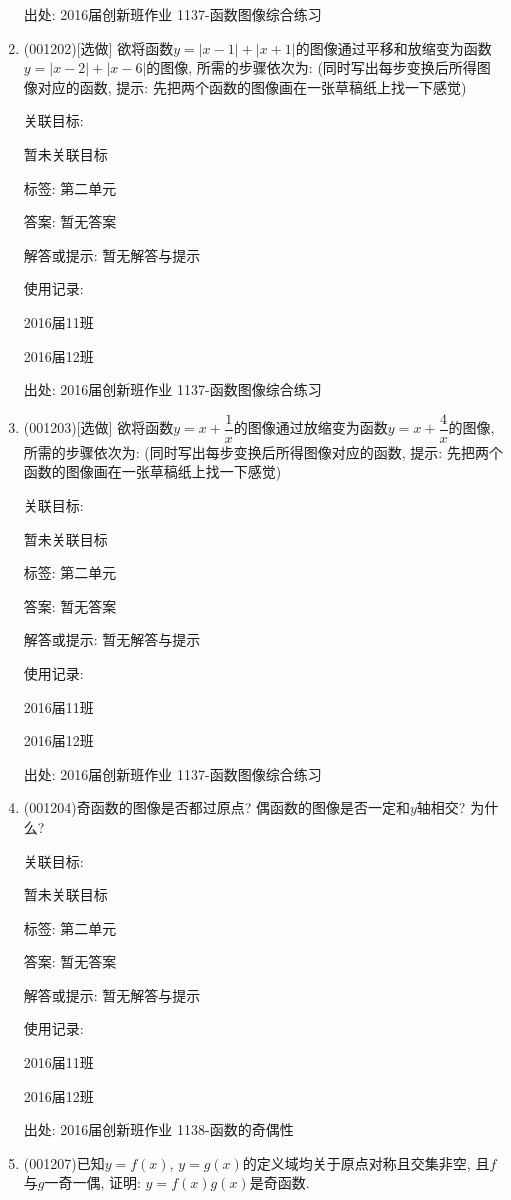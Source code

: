 \documentclass[10pt,a4paper]{article}
\begin{document}
\begin{enumerate}[1.]
出处: 2016届创新班作业	1137-函数图像综合练习
\item { (001202)}[选做]
欲将函数$y=|x-1|+|x+1|$的图像通过平移和放缩变为函数$y=|x-2|+|x-6|$的图像, 所需的步骤依次为: (同时写出每步变换后所得图像对应的函数, 提示: 先把两个函数的图像画在一张草稿纸上找一下感觉)


关联目标:

暂未关联目标



标签: 第二单元

答案: 暂无答案

解答或提示: 暂无解答与提示

使用记录:

2016届11班	

2016届12班	


出处: 2016届创新班作业	1137-函数图像综合练习
\item { (001203)}[选做]
欲将函数$y=x+\dfrac{1}{x}$的图像通过放缩变为函数$y=x+\dfrac{4}{x}$的图像, 所需的步骤依次为: (同时写出每步变换后所得图像对应的函数, 提示: 先把两个函数的图像画在一张草稿纸上找一下感觉)


关联目标:

暂未关联目标



标签: 第二单元

答案: 暂无答案

解答或提示: 暂无解答与提示

使用记录:

2016届11班	

2016届12班	


出处: 2016届创新班作业	1137-函数图像综合练习
\item { (001204)}奇函数的图像是否都过原点? 偶函数的图像是否一定和$y$轴相交? 为什么?


关联目标:

暂未关联目标



标签: 第二单元

答案: 暂无答案

解答或提示: 暂无解答与提示

使用记录:

2016届11班	

2016届12班	


出处: 2016届创新班作业	1138-函数的奇偶性
\item { (001207)}已知$y=f(x)$, $y=g(x)$的定义域均关于原点对称且交集非空, 且$f$与$g$一奇一偶, 证明: $y=f(x)g(x)$是奇函数.



\end{enumerate}
\end{document}
